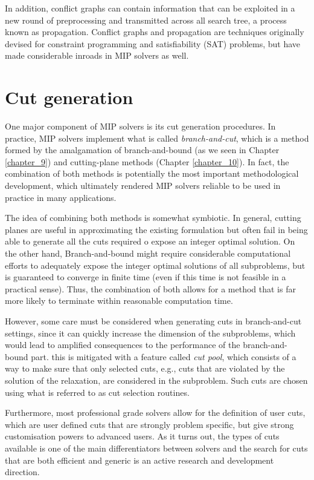 In addition, conflict graphs can contain information that can be exploited in a new round of preprocessing and transmitted across all search tree, a process known as propagation. Conflict graphs and propagation are techniques originally devised for constraint programming and satisfiability (SAT) problems, but have made considerable inroads in MIP solvers as well.


\section{Cut generation}

One major component of MIP solvers is its cut generation procedures. In practice, MIP solvers implement what is called \emph{branch-and-cut}, which is a method formed by the amalgamation of branch-and-bound (as we seen in Chapter \ref{chapter_9}) and cutting-plane methods (Chapter \ref{chapter_10}). In fact, the combination of both methods is potentially the most important methodological development, which ultimately rendered MIP solvers reliable to be used in practice in many applications. 

The idea of combining both methods is somewhat symbiotic. In general, cutting planes are useful in approximating the existing formulation but often fail in being able to generate all the cuts required o expose an integer optimal solution. On the other hand, Branch-and-bound might require considerable computational efforts to adequately expose the integer optimal solutions of all subproblems, but is guaranteed to converge in finite time (even if this time is not feasible in a practical sense). Thus, the combination of both allows for a method that is far more likely to terminate within reasonable computation time.

However, some care must be considered when generating cuts in branch-and-cut settings, since it can quickly increase the dimension of the subproblems, which would lead to amplified consequences to the performance of the branch-and-bound part. this is mitigated with a feature called \emph{cut pool}, which consists of a way to make sure that only selected cuts, e.g., cuts that are violated by the solution of the relaxation, are considered in the subproblem. Such cuts are chosen using what is referred to as cut selection routines.

Furthermore, most professional grade solvers allow for the definition of user cuts, which are user defined cuts that are strongly problem specific, but give strong customisation powers to advanced users. As it turns out, the types of cuts available is one of the main differentiators between solvers and the search for cuts that are both efficient and generic is an active research and development direction.

